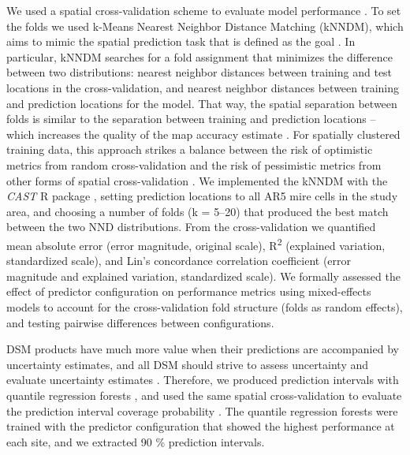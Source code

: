 \documentclass[soil, manuscript]{copernicus}
\begin{document}
We used a spatial cross-validation scheme to evaluate model performance \citep{wadouxSpatialCrossvalidationNot2021, meyerMachineLearningbasedGlobal2022}.
To set the folds we used k-Means Nearest Neighbor Distance Matching (kNNDM), which aims to mimic the spatial prediction task that is defined as the goal \citep{linnenbrinkKNNDMCVKfold2024}.
In particular, kNNDM searches for a fold assignment that minimizes the difference between two distributions: nearest neighbor distances between training and test locations in the cross-validation, and nearest neighbor distances between training and prediction locations for the model.
That way, the spatial separation between folds is similar to the separation between training and prediction locations -- which increases the quality of the map accuracy estimate \citep{linnenbrinkKNNDMCVKfold2024}.
For spatially clustered training data, this approach strikes a balance between the risk of optimistic metrics from random cross-validation and the risk of pessimistic metrics from other forms of spatial cross-validation \citep{wadouxSpatialCrossvalidationNot2021}.
We implemented the kNNDM with the \emph{CAST} R package \citep[v1.0,][]{meyerCASTPackageTraining2024}, setting prediction locations to all AR5 mire cells in the study area, and choosing a number of folds (k = 5--20) that produced the best match between the two NND distributions.
From the cross-validation we quantified mean absolute error (error magnitude, original scale), R\textsuperscript{2} (explained variation, standardized scale), and Lin's concordance correlation coefficient (error magnitude and explained variation, standardized scale).
We formally assessed the effect of predictor configuration on performance metrics using mixed-effects models to account for the cross-validation fold structure (folds as random effects), and testing pairwise differences between configurations.

DSM products have much more value when their predictions are accompanied by uncertainty estimates, and all DSM should strive to assess uncertainty \citep{arrouaysImpressionsDigitalSoil2020, wadouxMachineLearningDigital2020} and evaluate uncertainty estimates \citep{heuvelinkSpatialStatisticsSoil2022}.
Therefore, we produced prediction intervals with quantile regression forests \citep{meinshausenQuantileRegressionForests2006}, and used the same spatial cross-validation to evaluate the prediction interval coverage probability \citep{shresthaMachineLearningApproaches2006}.
The quantile regression forests were trained with the predictor configuration that showed the highest performance at each site, and we extracted 90 \% prediction intervals.
\end{document}
